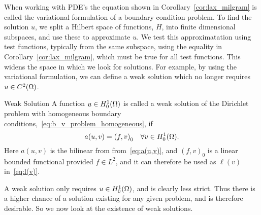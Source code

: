 When working with PDE's the equation shown in Corollary~\ref{cor:lax_milgram} 
is called the variational formulation of a boundary condition problem. 
To find the solution $u$, we split a Hilbert space of functions, $H$, 
into finite dimensional subspaces, and use these to approximate $u$. 
We test this approximatation using test functions, typically from the same subspace,
 using the equality in Corollary~\ref{cor:lax_milgram}, which must be true for all test functions.
This widens the 
space in which we look for solutions.
For example, by using the variational formulation, we can define a weak solution 
which no longer requires $u \in C^2(\Omega)$.
\begin{defn}{Weak Solution}
    A function $u\in H_0^1(\Omega)$ is called a weak solution of 
    the Dirichlet problem with homogeneous boundary conditions,~\eqref{eq:b_v_problem_homogeneous}, if 
     \begin{equation*}
        a(u,v) = {(f,v)}_0 \quad \forall v \in H_0^1(\Omega).
     \end{equation*}
     Here $a(u,v)$ is the bilinear from from~\eqref{eq:a(u,v)}, 
     and ${(f,v)}_0$ is a linear bounded functional provided $f\in L^2$, and it can therefore be used as $\ell(v)$ in~\eqref{eq:l(v)}.
\end{defn}
A weak solution only requires $u\in H_0^1(\Omega)$, and is clearly less strict. 
Thus there is a higher chance of a solution existing for any given problem, 
and is therefore desirable. So we now look at the existence of weak solutions.


